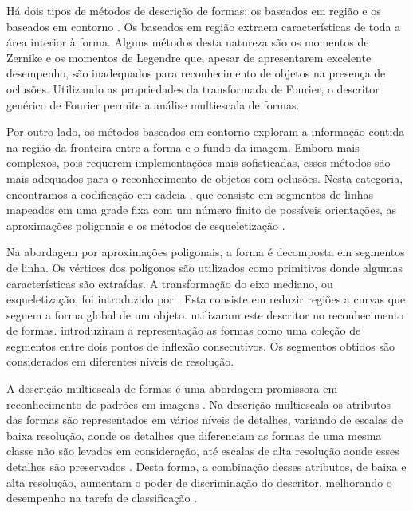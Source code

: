 Há dois tipos de métodos de descrição de formas: os baseados em região e os baseados em contorno \cite{Zhang:2004}. Os baseados em região extraem características de toda a área interior à forma. Alguns métodos desta natureza são os momentos de Zernike \cite{Kim:2000} e os momentos de Legendre \cite{Yang:2006} que, apesar de apresentarem excelente desempenho, são inadequados para reconhecimento de objetos na presença de oclusões. Utilizando as propriedades da transformada de Fourier, o descritor genérico de Fourier \cite{Zhang:2002} permite a análise multiescala de formas.

Por outro lado, os métodos baseados em contorno exploram a informação contida na região da fronteira entre a forma e o fundo da imagem. Embora mais complexos, pois requerem implementações mais sofisticadas, esses métodos são mais adequados para o reconhecimento de objetos com oclusões. Nesta categoria, encontramos a codificação em cadeia \cite[p~337]{Costa:2009}, que consiste em segmentos de linhas mapeados em uma grade fixa com um número finito de possíveis orientações, as aproximações poligonais \cite[p~340--351]{Costa:2009} e os métodos de esqueletização \cite[p~394--400]{Costa:2009}. 

Na abordagem por aproximações poligonais, a forma é decomposta em segmentos de linha. Os vértices dos polígonos são utilizados como primitivas donde algumas características são extraídas. A transformação do eixo mediano, ou esqueletização, foi introduzido por . Esta consiste em reduzir regiões a curvas que seguem a forma global de um objeto.  utilizaram este descritor no reconhecimento de formas.  introduziram a representação as formas como uma coleção de segmentos entre dois pontos de inflexão consecutivos. Os segmentos obtidos são considerados em diferentes níveis de resolução. 


A descrição multiescala de formas \cite{LiKuangLiuEtAl2016,ShuPanWu2015, HuangHanHe2014, Costa:2009} é uma abordagem promissora em reconhecimento de padrões em imagens \cite{Direkoglu:2011}. Na descrição multiescala os atributos das formas são representados em vários níveis de detalhes, variando de escalas de baixa resolução, aonde os detalhes que diferenciam as formas de uma mesma classe não são levados em consideração, até escalas de alta resolução aonde esses detalhes são preservados \cite{Ullman:1996}. Desta forma, a combinação desses atributos, de baixa e alta resolução, aumentam o poder de discriminação do descritor, melhorando o desempenho na tarefa de classificação \cite{Direkoglu:2011}.


